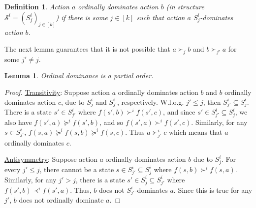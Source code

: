 \documentclass[letterpaper]{article} %
\def\calS{\mathcal{S}}
\newtheorem{lemma}[theorem]{Lemma}
\newtheorem{definition}{Definition}
\begin{document}
\begin{definition}
Action $a$ \emph{ordinally dominates} action $b$ (in structure $\calS^i =(S^i_j)_{j\in [k]}$) if
there is some $j \in [k]$ such that action $a$ $S^i_j$-dominates action $b$.
\end{definition}

The next lemma guarantees that it is not possible that $a \succ_j b$ and $b \succ_{j'} a$ for some $j'\neq j$.
\begin{lemma}Ordinal dominance is a partial order.
\end{lemma}
\begin{proof}
\underline{Transitivity}: Suppose action $a$ ordinally dominates action $b$ and $b$ ordinally dominates action $c$, due to $S^i_j$ and $S^i_{j'}$, respectively. W.l.o.g. $j'\leq j$, then $S^i_{j'} \subseteq S^i_{j}$. There is a state $s'\in S^i_{j'}$ where $f(s',b) \succ^i f(s',c)$, and since $s'\in S^i_{j'}\subseteq S^i_{j}$, we also have $f(s',a) \succeq^i f(s',b)$, and so $f(s',a)\succ^i f(s',c)$. Similarly, for any $s\in S^i_{j'}$, $f(s,a) \succeq^i f(s,b) \succeq^i f(s,c)$. Thus $a \succ^i_{j'} c$ which means that $a$ ordinally dominates $c$.

\underline{Antisymmetry}: Suppose action $a$ ordinally dominates action $b$ due to $S^i_j$. For every $j'\leq j$, there cannot be a state $s\in S^i_{j'}\subseteq S^i_j$ where $f(s,b) \succ^i f(s,a)$. Similarly, for any $j'>j$, there is a state $s'\in S^i_j \subseteq S^i_{j'}$ where $f(s',b) \prec^i f(s',a)$. Thus, $b$ does not $S^i_{j'}$-dominates $a$. Since this is true for any $j'$, $b$ does not ordinally dominate $a$.
\end{proof}

\def\celcius{^\circ}
\end{document}
